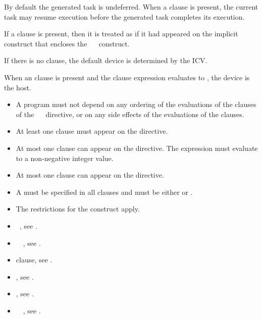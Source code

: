 By default the generated task is undeferred. When a  clause is present, the current task may resume execution before the generated task completes its execution.

If a  clause is present, then it is treated as if it had appeared on the implicit  construct that encloses the ~~ construct.

If there is no  clause, the default device is determined by the  ICV.

When an  clause is present and the  clause expression evaluates to , the device is the host. 

\restrictions
\begin{itemize}
\item A program must not depend on any ordering of the evaluations of the clauses of the ~~ directive, or on any side effects of the evaluations of the clauses.
\item At least one  clause must appear on the directive.
\item At most one  clause can appear on the directive. The  expression must evaluate to a non-negative integer value.
\item At most one  clause can appear on the directive.
\item A  must be specified in all  clauses and must be either  or .
\item The restrictions for the  construct apply. 
\end{itemize}

\crossreferences
\begin{itemize}
\item {}~, see .
\item {}~~, see .
\item {} clause, see .
\item {}, see .
\item {}, see .
\item {}~~, see . 
\end{itemize}

